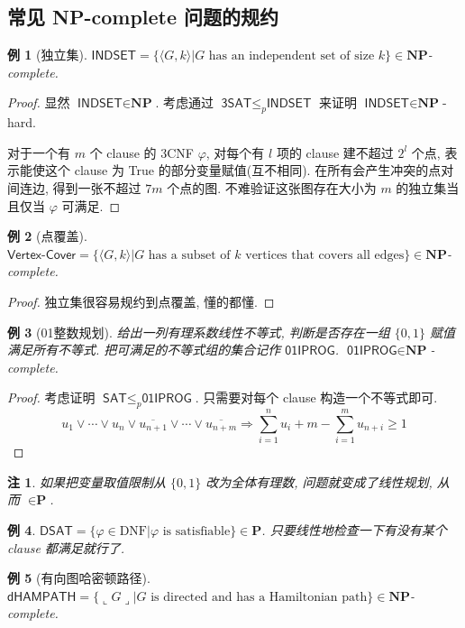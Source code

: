 \documentclass[8pt]{article}
\theoremstyle{compact}
\newtheorem{example}{例}[section]
\newtheorem{remark}{注}[section]
\def\le{\leqslant}
\def\ge{\geqslant}
\def\rep#1{\llcorner{#1}\lrcorner}
\def\P{\textbf{P}}
\def\NP{\textbf{NP}}
\begin{document}
\subsection{常见 \NP-complete 问题的规约}
\begin{example}[独立集]
	$\textsf{INDSET} = \{\langle G, k \rangle | G \text{ has an independent set of size } k\} \in \NP$-complete.
\end{example}
\begin{proof}
	显然 $\textsf{INDSET} \in \NP$. 考虑通过 $\textsf{3SAT} \le_p \textsf{INDSET}$ 来证明 $\textsf{INDSET} \in \NP$-hard.

	对于一个有 $m$ 个 clause 的 3CNF $\varphi$, 对每个有 $l$ 项的 clause 建不超过 $2^l$ 个点, 表示能使这个 clause 为 True 的部分变量赋值(互不相同). 在所有会产生冲突的点对间连边, 得到一张不超过 $7m$ 个点的图. 不难验证这张图存在大小为 $m$ 的独立集当且仅当 $\varphi$ 可满足.
\end{proof}
\begin{example}[点覆盖]
	$\textsf{Vertex-Cover} = \{\langle G, k \rangle | G \text{ has a subset of } k \text{ vertices that covers all edges}\} \in \NP$-complete.
\end{example}
\begin{proof}
	独立集很容易规约到点覆盖, 懂的都懂.
\end{proof}
\begin{example}[01整数规划]
	给出一列有理系数线性不等式, 判断是否存在一组 $\{0, 1\}$ 赋值满足所有不等式. 把可满足的不等式组的集合记作 $\textsf{01IPROG}$. $\textsf{01IPROG} \in \NP$-complete.
\end{example}
\begin{proof}
	考虑证明 $\textsf{SAT} \le_p \textsf{01IPROG}$. 只需要对每个 clause 构造一个不等式即可.
	$$u_1 \vee \cdots \vee u_n \vee \overline{u_{n+1}} \vee \cdots \vee \overline{u_{n+m}} \Rightarrow \sum_{i=1}^{n}u_i + m - \sum_{i=1}^{m}u_{n+i} \ge 1$$
\end{proof}
\begin{remark}
	如果把变量取值限制从 $\{0, 1\}$ 改为全体有理数, 问题就变成了线性规划, 从而 $\in \P$.
\end{remark}
\begin{example}
	$\textsf{DSAT} = \{\varphi \in \text{DNF} | \varphi \text{ is satisfiable}\} \in \P$. 只要线性地检查一下有没有某个 clause 都满足就行了.
\end{example}
\begin{example}[有向图哈密顿路径]
	$\textsf{dHAMPATH} = \{\rep{G} | G \text{ is directed and has a Hamiltonian path}\} \in \NP$-complete.
\end{example}
\end{document}
